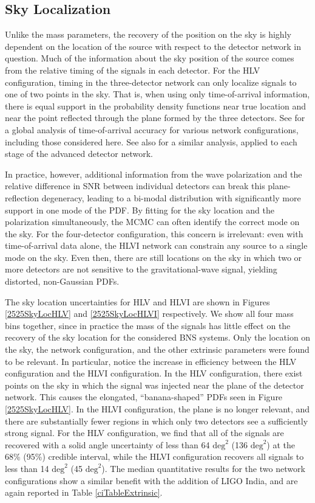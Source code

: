 \documentclass[11pt,a4paper]{emulateapj} 
\begin{document}
\subsection{Sky Localization}
\label{skySection}
 
Unlike the mass parameters, the recovery of the position on the sky is
highly dependent on the location of the source with respect to the
detector network in question.  Much of the information about the sky
position of the source comes from the relative timing of the signals
in each detector.  For the HLV configuration, timing in the
three-detector network can only localize signals to one of two points
in the sky.  That is, when using only time-of-arrival information,
there is equal support in the probability density functions near true
location and near the point reflected through the plane formed by the
three detectors.  See \cite{Fairhurst2011} for a global analysis of
time-of-arrival accuracy for various network configurations, including
those considered here.  See also \cite{Prospects2013} for a similar analysis,
applied to each stage of the advanced detector network.
  
  
In practice, however, additional information from the wave
polarization and the relative difference in SNR between individual
detectors can break this plane-reflection degeneracy, leading to a
bi-modal distribution with significantly more support in one mode of
the PDF.  By fitting for the sky location and the polarization
simultaneously, the MCMC can often identify the correct mode on the
sky.  For the four-detector configuration, this concern is irrelevant:
even with time-of-arrival data alone, the HLVI network can constrain
any source to a single mode on the sky.  Even then, there are still
locations on the sky in which two or more detectors are not sensitive
to the gravitational-wave signal, yielding distorted, non-Gaussian
PDFs.

The sky location uncertainties for HLV and HLVI are shown in Figures
\ref{2525SkyLocHLV} and \ref{2525SkyLocHLVI} respectively.  We show
all four mass bins together, since in practice the mass of the signals
has little effect on the recovery of the sky location for the
considered BNS systems.  Only the location on the sky, the network
configuration, and the other extrinsic parameters were found to be
relevant.  In particular, notice the increase in efficiency between
the HLV configuration and the HLVI configuration.  In the HLV
configuration, there exist points on the sky in which the signal was
injected near the plane of the detector network.  This causes the
elongated, ``banana-shaped'' PDFs seen in Figure \ref{2525SkyLocHLV}.
In the HLVI configuration, the plane is no longer relevant, and there
are substantially fewer regions in which only two detectors see a
sufficiently strong signal.  For the HLV configuration, we find that
 all of the signals are recovered with
a solid angle uncertainty of less than 64 $\mathrm{deg}^2$ (136 $\mathrm{deg}^2$)
at the 68\% (95\%) credible interval, while the HLVI configuration 
recovers all signals to less than 14 $\mathrm{deg}^2$ (45 $\mathrm{deg}^2$).
The median quantitative results for the two network configurations show a similar
 benefit with the addition of LIGO India, and are again reported in Table \ref{ciTableExtrinsic}. 
\end{document}
